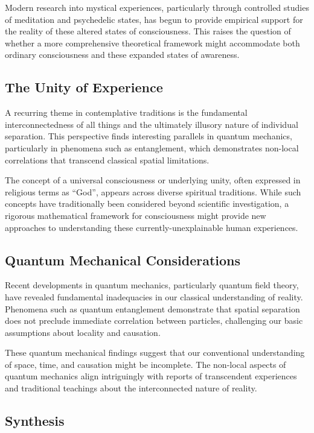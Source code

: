 \documentclass{article}
\theoremstyle{definition}
\theoremstyle{axiom}
\theoremstyle{theorem}
\theoremstyle{proposition}
\begin{document}
Modern research into mystical experiences, particularly through controlled studies of meditation and psychedelic states, has begun to provide empirical support for the reality of these altered states of consciousness. This raises the question of whether a more comprehensive theoretical framework might accommodate both ordinary consciousness and these expanded states of awareness.

\subsection{The Unity of Experience}

A recurring theme in contemplative traditions is the fundamental interconnectedness of all things and the ultimately illusory nature of individual separation. This perspective finds interesting parallels in quantum mechanics, particularly in phenomena such as entanglement, which demonstrates non-local correlations that transcend classical spatial limitations.

The concept of a universal consciousness or underlying unity, often expressed in religious terms as \enquote{God}, appears across diverse spiritual traditions. While such concepts have traditionally been considered beyond scientific investigation, a rigorous mathematical framework for consciousness might provide new approaches to understanding these currently-unexplainable human experiences.

\subsection{Quantum Mechanical Considerations}

Recent developments in quantum mechanics, particularly quantum field theory, have revealed fundamental inadequacies in our classical understanding of reality. Phenomena such as quantum entanglement demonstrate that spatial separation does not preclude immediate correlation between particles, challenging our basic assumptions about locality and causation.

These quantum mechanical findings suggest that our conventional understanding of space, time, and causation might be incomplete. The non-local aspects of quantum mechanics align intriguingly with reports of transcendent experiences and traditional teachings about the interconnected nature of reality.

\subsection{Synthesis}
\end{document}

